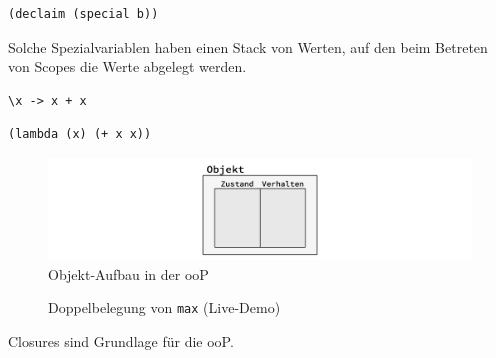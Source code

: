 		\lstLisp[Spezialvariablen]
		\begin{lstlisting}
(declaim (special b))
		\end{lstlisting}

		Solche Spezialvariablen haben einen Stack von Werten, auf den beim Betreten von Scopes die Werte abgelegt werden.

	\begin{lstlisting}
\x -> x + x
		\end{lstlisting}

		\begin{lstlisting}
(lambda (x) (+ x x))
		\end{lstlisting}

		\begin{figure}[H]
			\caption{Objekt-Aufbau in der ooP}
			\includegraphics[width=\textwidth]{workfiles/v11_2}
		\end{figure}

		\begin{figure}[H]
			\centering
			\caption{Doppelbelegung von \texttt{max} (Live-Demo)}
		\end{figure}

		Closures sind Grundlage für die ooP.

		\begin{figure}[H]
		\end{figure}


